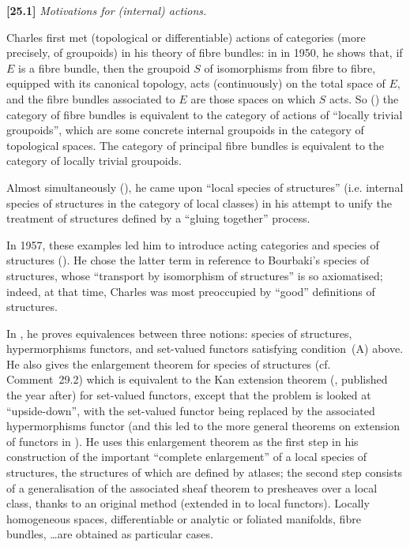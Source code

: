 \documentclass[a4paper,fleqn]{article}
\theoremstyle{plain}
\theoremstyle{definition}
\newenvironment{longcomm}[1]
  {\noindent\textbf{[#1]}\rmfamily}
  {}
\begin{document}
\begin{longcomm}{25.1}
  \emph{Motivations for (internal) actions.}

  Charles first met (topological or differentiable) actions of categories (more precisely, of groupoids) in his theory of fibre bundles: in \cite{coll28} in 1950, he shows that, if $E$ is a fibre bundle, then the groupoid $S$ of isomorphisms from fibre to fibre, equipped with its canonical topology, acts (continuously) on the total space of $E$, and the fibre bundles associated to $E$ are those spaces on which $S$ acts.
  So (\cite{coll50}) the category of fibre bundles is equivalent to the category of actions of ``locally trivial groupoids'', which are some concrete internal groupoids in the category of topological spaces.
  The category of principal fibre bundles is equivalent to the category of locally trivial groupoids.

  Almost simultaneously (\cite{coll39}), he came upon ``local species of structures'' (i.e. internal species of structures in the category of local classes) in his attempt to unify the treatment of structures defined by a ``gluing together'' process.

  In 1957, these examples led him to introduce acting categories and species of structures (\cite{coll47}).
  He chose the latter term in reference to Bourbaki's species of structures, whose ``transport by isomorphism of structures'' is so axiomatised;
  indeed, at that time, Charles was most preoccupied by ``good'' definitions of structures.

  In \cite{coll47}, he proves equivalences between three notions: species of structures, hypermorphisms functors, and set-valued functors satisfying condition~(A) above.
  He also gives the enlargement theorem for species of structures (cf. Comment~29.2) which is equivalent to the Kan extension theorem (\cite{comm58}, published the year after) for set-valued functors, except that the problem is looked at ``upside-down'', with the set-valued functor being replaced by the associated hypermorphisms functor (and this led to the more general theorems on extension of functors in \cite{coll77,coll122}).
  He uses this enlargement theorem as the first step in his construction of the important ``complete enlargement'' of a local species of structures, the structures of which are defined by atlases;
  the second step consists of a generalisation of the associated sheaf theorem to presheaves over a local class, thanks to an original method (extended in \cite{coll110} to local functors).
  Locally homogeneous spaces, differentiable or analytic or foliated manifolds, fibre bundles, \ldots are obtained as particular cases.


\end{longcomm}
\end{document}
